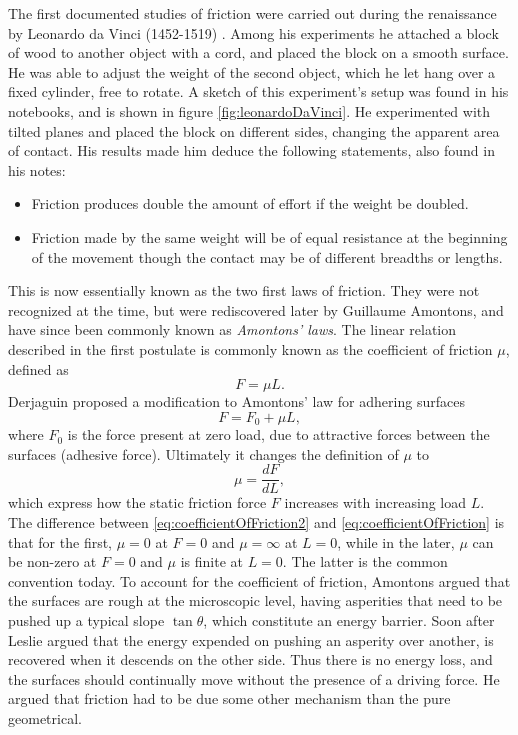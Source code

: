 \documentclass[twoside,english]{uiofysmaster}
\begin{document}
\noindent 
The first documented studies of friction were carried out during the renaissance by Leonardo da Vinci (1452-1519) \cite{LeonardoDaVinciStudies}.
Among his experiments he attached a block of wood to another object with a cord, and placed the block on a smooth surface.
He was able to adjust the weight of the second object, which he let hang over a fixed cylinder, free to rotate. 
A sketch of this experiment's setup was found in his notebooks, and is shown in figure \ref{fig:leonardoDaVinci}.
He experimented with tilted planes and placed the block on different sides, changing the apparent area of contact.
His results made him deduce the following statements, also found in his notes:
\begin{itemize}
	\item Friction produces double the amount of effort if the weight be doubled. 
	\item Friction made by the same weight will be of equal resistance at the beginning of the movement though the contact may be of different breadths or lengths.
\end{itemize}
This is now essentially known as the two first laws of friction. 
They were not recognized at the time, but were rediscovered later by Guillaume Amontons, and have since been commonly known as \textit{Amontons' laws}.
The linear relation described in the first postulate is commonly known as the coefficient of friction $\mu$, defined as
\begin{equation}
F = \mu L \label{eq:coefficientOfFriction2}.
\end{equation}
Derjaguin proposed a modification to Amontons' law for adhering surfaces
\begin{equation}
F = F_0 + \mu L \label{eq:coefficientF0}, 
\end{equation}
where $F_0$ is the force present at zero load, due to attractive forces between the surfaces (adhesive force).
Ultimately it changes the definition of $\mu$ to 
\begin{equation}
\mu = \frac{dF}{dL}, \label{eq:coefficientOfFriction}
\end{equation}
which express how the static friction force $F$ increases with increasing load $L$.
The difference between \eqref{eq:coefficientOfFriction2} and \eqref{eq:coefficientOfFriction} is that for the first, $\mu=0$ at $F=0$ and $\mu=\infty$ at $L=0$, while in the later, $\mu$ can be non-zero at $F=0$ and $\mu$ is finite at $L=0$.
The latter is the common convention today.
To account for the coefficient of friction, Amontons argued that the surfaces are rough at the microscopic level, having asperities that need to be pushed up a typical slope $\tan\theta$, which constitute an energy barrier.
Soon after Leslie argued that the energy expended on pushing an asperity over another, is recovered when it descends on the other side. 
Thus there is no energy loss, and the surfaces should continually move without the presence of a driving force. 
He argued that friction had to be due some other mechanism than the pure geometrical.
\end{document}
